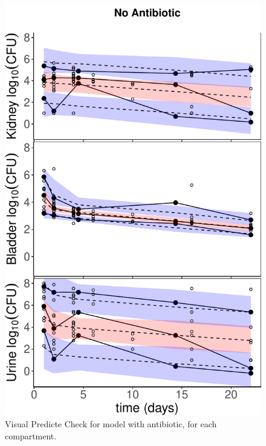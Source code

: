 \documentclass{article}
\begin{document}
\begin{figure}
	\centering
	\includegraphics[width=\linewidth]{images/plt_vpc_merged_Ct_ONLY.pdf}
	\caption{Visual Predicte Check for model with antibiotic, for each compartment.}
	\label{fig:ModelIndFits}
\end{figure}
\end{document}
